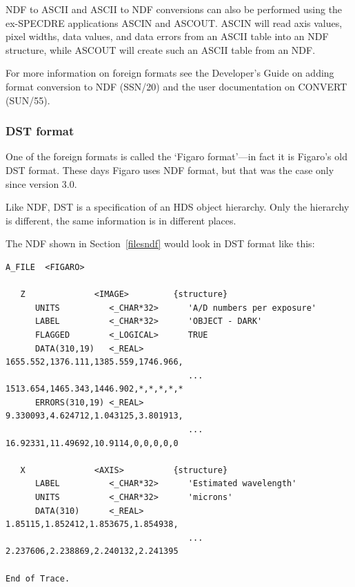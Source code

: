 \documentclass[11pt,twoside]{article}
\newcommand{\htmlref}[2]{#1}
\newcommand{\xref}[3]{#1}
\newcommand{\latorhtm}[2]{#1}
\newcommand{\latorhtm}[2]{#2}
\begin{document}
   NDF to ASCII and ASCII to NDF conversions can also be performed
   using the ex-SPECDRE applications ASCIN and ASCOUT. ASCIN will
   read axis values, pixel widths, data values, and data errors from
   an ASCII table into an NDF structure, while ASCOUT will create
   such an ASCII table from an NDF.

   For more information on foreign formats see the Developer's Guide
   on adding format conversion to NDF \xref{(SSN/20)}{ssn20}{}
   and the user documentation on CONVERT \xref{(SUN/55)}{sun55}{}.


\subsubsection{\label{filesdst}DST format}

   One of the foreign formats is called the `Figaro format'\latorhtm{---}{-}in
   fact it is Figaro's old DST format. These days Figaro uses NDF format,
   but that was the case only since version 3.0.

   Like NDF, DST is a specification of an HDS object hierarchy. Only the
   hierarchy is different, the same information is in different places.

   The NDF shown in \latorhtm{Section~\ref{filesndf}}
   {the section on the \htmlref{NDF format}{filesndf}}
   would look in DST format like this:

\begin{verbatim}
A_FILE  <FIGARO>

   Z              <IMAGE>         {structure}
      UNITS          <_CHAR*32>      'A/D numbers per exposure'
      LABEL          <_CHAR*32>      'OBJECT - DARK'
      FLAGGED        <_LOGICAL>      TRUE
      DATA(310,19)   <_REAL>         1655.552,1376.111,1385.559,1746.966,
                                     ... 1513.654,1465.343,1446.902,*,*,*,*,*
      ERRORS(310,19) <_REAL>        9.330093,4.624712,1.043125,3.801913,
                                     ... 16.92331,11.49692,10.9114,0,0,0,0,0

   X              <AXIS>          {structure}
      LABEL          <_CHAR*32>      'Estimated wavelength'
      UNITS          <_CHAR*32>      'microns'
      DATA(310)      <_REAL>         1.85115,1.852412,1.853675,1.854938,
                                     ... 2.237606,2.238869,2.240132,2.241395

End of Trace.
\end{verbatim}
\end{document}
